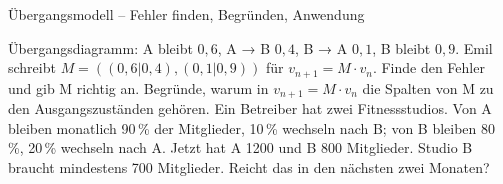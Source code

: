 \begin{aufgabe}{Übergangsmodell – Fehler finden, Begründen, Anwendung}
\begin{teile}
\teil Übergangsdiagramm: A bleibt $0{,}6$, A → B $0{,}4$, B → A $0{,}1$, B bleibt $0{,}9$. Emil schreibt $M = ((0{,}6 | 0{,}4), (0{,}1 | 0{,}9))$ für $v_{n+1} = M \cdot v_n$. Finde den Fehler und gib M richtig an.
\teil Begründe, warum in $v_{n+1} = M \cdot v_n$ die Spalten von M zu den Ausgangszuständen gehören.
\teil Ein Betreiber hat zwei Fitnessstudios. Von A bleiben monatlich 90\,\% der Mitglieder, 10\,\% wechseln nach B; von B bleiben 80\,\%, 20\,\% wechseln nach A. Jetzt hat A 1200 und B 800 Mitglieder. Studio B braucht mindestens 700 Mitglieder. Reicht das in den nächsten zwei Monaten?
\end{teile}
\end{aufgabe}
